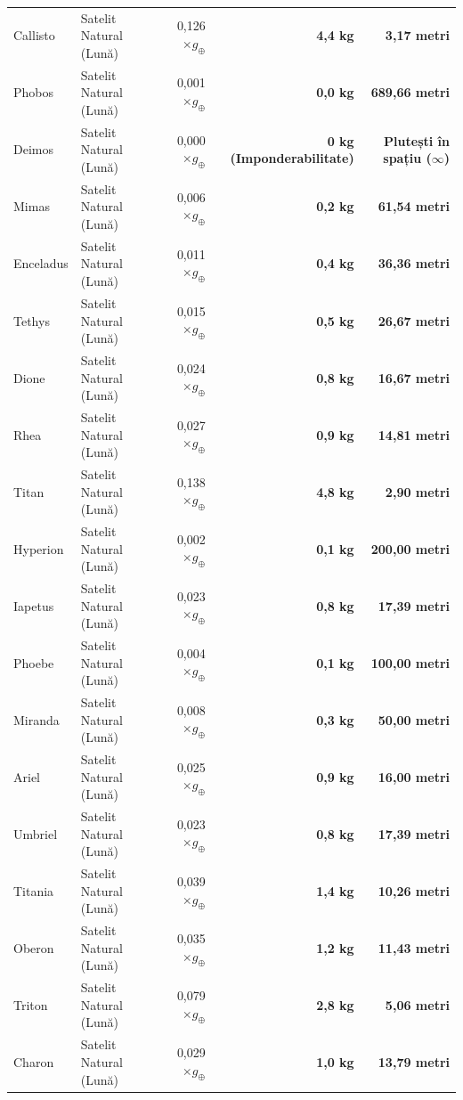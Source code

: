 \begin{longtable}{@{} >{\raggedright\arraybackslash}p{2.5cm} >{\raggedright\arraybackslash}p{3.1cm} r r r @{}}
Callisto & Satelit Natural (Lună) & 0,126 $\times g_\oplus$ & \textbf{4,4 kg} & \textbf{3,17 metri} \\
Phobos & Satelit Natural (Lună) & 0,001 $\times g_\oplus$ & \textbf{0,0 kg} & \textbf{689,66 metri} \\
Deimos & Satelit Natural (Lună) & 0,000 $\times g_\oplus$ & \textbf{0 kg (Imponderabilitate)} & \textbf{Plutești în spațiu ($\infty$)} \\
Mimas & Satelit Natural (Lună) & 0,006 $\times g_\oplus$ & \textbf{0,2 kg} & \textbf{61,54 metri} \\
Enceladus & Satelit Natural (Lună) & 0,011 $\times g_\oplus$ & \textbf{0,4 kg} & \textbf{36,36 metri} \\
Tethys & Satelit Natural (Lună) & 0,015 $\times g_\oplus$ & \textbf{0,5 kg} & \textbf{26,67 metri} \\
Dione & Satelit Natural (Lună) & 0,024 $\times g_\oplus$ & \textbf{0,8 kg} & \textbf{16,67 metri} \\
Rhea & Satelit Natural (Lună) & 0,027 $\times g_\oplus$ & \textbf{0,9 kg} & \textbf{14,81 metri} \\
Titan & Satelit Natural (Lună) & 0,138 $\times g_\oplus$ & \textbf{4,8 kg} & \textbf{2,90 metri} \\
Hyperion & Satelit Natural (Lună) & 0,002 $\times g_\oplus$ & \textbf{0,1 kg} & \textbf{200,00 metri} \\
Iapetus & Satelit Natural (Lună) & 0,023 $\times g_\oplus$ & \textbf{0,8 kg} & \textbf{17,39 metri} \\
Phoebe & Satelit Natural (Lună) & 0,004 $\times g_\oplus$ & \textbf{0,1 kg} & \textbf{100,00 metri} \\
Miranda & Satelit Natural (Lună) & 0,008 $\times g_\oplus$ & \textbf{0,3 kg} & \textbf{50,00 metri} \\
Ariel & Satelit Natural (Lună) & 0,025 $\times g_\oplus$ & \textbf{0,9 kg} & \textbf{16,00 metri} \\
Umbriel & Satelit Natural (Lună) & 0,023 $\times g_\oplus$ & \textbf{0,8 kg} & \textbf{17,39 metri} \\
Titania & Satelit Natural (Lună) & 0,039 $\times g_\oplus$ & \textbf{1,4 kg} & \textbf{10,26 metri} \\
Oberon & Satelit Natural (Lună) & 0,035 $\times g_\oplus$ & \textbf{1,2 kg} & \textbf{11,43 metri} \\
Triton & Satelit Natural (Lună) & 0,079 $\times g_\oplus$ & \textbf{2,8 kg} & \textbf{5,06 metri} \\
Charon & Satelit Natural (Lună) & 0,029 $\times g_\oplus$ & \textbf{1,0 kg} & \textbf{13,79 metri} \\

\end{longtable}
